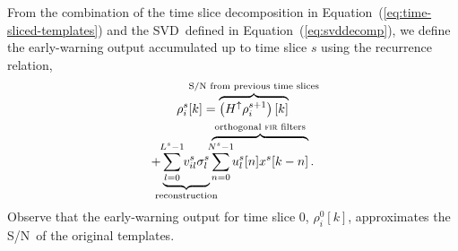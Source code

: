 \documentclass[preprint2]{aastex}
\newcommand{\SNR}{S/N}%
\newcommand{\SVD}{SVD}%
\def\clap#1{\hbox to 0pt{\hss#1\hss}}
\def\mathclap{\mathpalette\mathclapinternal}
\def\mathclapinternal#1#2{\clap{$\mathsurround=0pt#1{#2}$}}
\begin{document}
From the combination of the time slice decomposition in
Equation~(\ref{eq:time-sliced-templates}) and the \SVD\ defined in
Equation~(\ref{eq:svddecomp}), we define the early-warning output accumulated
up to time slice $s$ using the recurrence relation,
%
%
\begin{multline}
	\rho_i^s [k] =%
		\overbrace{
			\left(H^\uparrow \rho_i^{s+1}\right)[k]
		}^\textrm{\clap{S/N from previous time slices}} \\
		+
		\underbrace{
			\sum_{\mathclap{l=0}}^{\mathclap{L^s-1}} v_{il}^s \sigma_l^s
		}_\textrm{\clap{reconstruction}}
		\overbrace{
			\sum_{\mathclap{n=0}}^{\mathclap{N^s-1}} u_l^s[n] x^s[k-n]
		}^\textrm{\clap{orthogonal {\sc fir} filters}} .
\end{multline}
%
%
Observe that the early-warning output for time slice 0, $\rho_i^0[k]$,
approximates the \SNR\ of the original templates.
%
%
\end{document}
